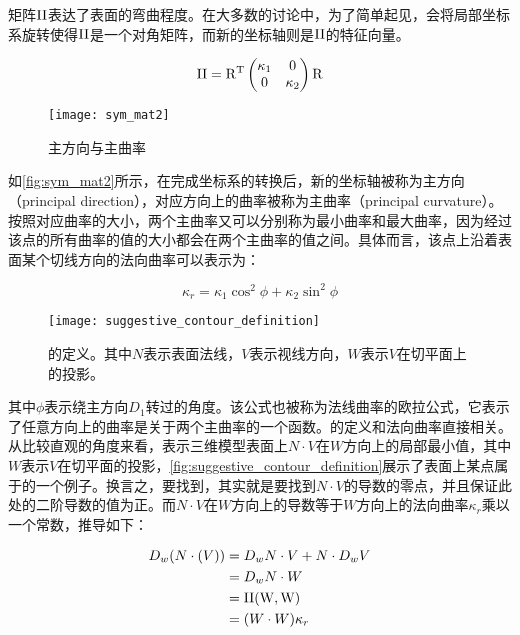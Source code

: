 矩阵$\rm II$表达了表面的弯曲程度。在大多数的讨论中，为了简单起见，会将局部坐标系旋转使得$\rm II$是一个对角矩阵，而新的坐标轴则是$\rm II$的特征向量。

\begin{equation}
    \rm II = R^T
    \begin{pmatrix}
        \kappa_1 & 0 \\
        0 & \kappa_2
    \end{pmatrix}
    R
\end{equation}

\begin{figure}[tbh]
    \centering
    \texttt{[image: sym\_mat2]}
    \caption{\label{fig:sym_mat2}
    主方向与主曲率}
\end{figure}

如\autoref{fig:sym_mat2}\cite{rusinkiewicz2008line}所示，在完成坐标系的转换后，新的坐标轴被称为主方向（principal direction），对应方向上的曲率被称为主曲率（principal curvature）。按照对应曲率的大小，两个主曲率又可以分别称为最小曲率和最大曲率，因为经过该点的所有曲率的值的大小都会在两个主曲率的值之间。具体而言，该点上沿着表面某个切线方向的法向曲率可以表示为：

\begin{equation}
    \kappa_r = \kappa_1\cos^2\phi + \kappa_2\sin^2\phi
\end{equation}

\begin{figure}[tbp]
    \centering
    \texttt{[image: suggestive\_contour\_definition]}
    \caption{\label{fig:suggestive_contour_definition}
    \scon{}的定义。其中$N$表示表面法线，$V$表示视线方向，$W$表示$V$在切平面上的投影。}
\end{figure}

其中$\phi$表示绕主方向$D_1$转过的角度。该公式也被称为法线曲率的欧拉公式，它表示了任意方向上的曲率是关于两个主曲率的一个函数。\scon{}的定义和法向曲率直接相关。从比较直观的角度来看，\scon{}表示三维模型表面上$N\cdot{V}$在$W$方向上的局部最小值，其中$W$表示$V$在切平面的投影，\autoref{fig:suggestive_contour_definition}展示了表面上某点属于\scon{}的一个例子。换言之，要找到\scon{}，其实就是要找到$N\cdot{V}$的导数的零点，并且保证此处的二阶导数的值为正。而$N\cdot{V}$在$W$方向上的导数等于$W$方向上的法向曲率$\kappa_r$乘以一个常数，推导如下：

\begin{align}
    D_w(N\cdot(V)) &= D_w{N}\cdot{V} + N\cdot{D_w{V}} \\
                   &= D_w{N}\cdot{W} \\
                   &= \rm II(W, W) \\
                   &= (W\cdot{W})\kappa_r
\end{align}
  
